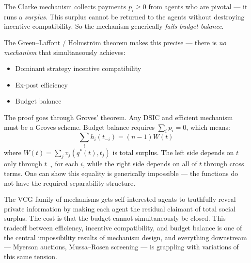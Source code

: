 \documentclass[11pt,english]{article}
\begin{document}
The Clarke mechanism collects payments $p_i \geq 0$ from agents who are pivotal --- it runs a \textit{surplus}. This surplus cannot be returned to the agents without destroying incentive compatibility. So the mechanism generically \textit{fails budget balance}.

The Green--Laffont / Holmstr\"{o}m theorem makes this precise --- there is \textit{no mechanism} that simultaneously achieves:
\begin{itemize}
    \item Dominant strategy incentive compatibility
    \item Ex-post efficiency
    \item Budget balance
\end{itemize}
The proof goes through Groves' theorem. Any DSIC and efficient mechanism must be a Groves scheme. Budget balance requires $\sum_i p_i = 0$, which means:
\begin{equation}
    \sum_i h_i(t_{-i}) = (n-1)W(t)
\end{equation}
where $W(t) = \sum_j v_j(q^*(t), t_j)$ is total surplus. The left side depends on $t$ only through $t_{-i}$ for each $i$, while the right side depends on all of $t$ through cross terms. One can show this equality is generically impossible --- the functions do not have the required separability structure.


The VCG family of mechanisms gets self-interested agents to truthfully reveal private information by making each agent the residual claimant of total social surplus. The cost is that the budget cannot simultaneously be closed. This tradeoff between efficiency, incentive compatibility, and budget balance is one of the central impossibility results of mechanism design, and everything downstream --- Myerson auctions, Mussa--Rosen screening --- is grappling with variations of this same tension.
\end{document}
